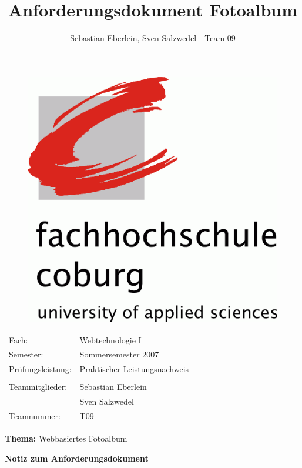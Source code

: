 \documentclass[a4paper,12pt,liststotocnumbered]{scrartcl}
\title{Anforderungsdokument Fotoalbum}
\author{Sebastian Eberlein, Sven Salzwedel - Team 09}
\begin{document}
\begin{figure}[h]
	\begin{center}
		\includegraphics[width=\textwidth/2]{logo}
	\end{center}
\end{figure}

\begin{tabularx}{\textwidth}{lX}
	Fach:&Webtechnologie I\\
	Semester:&Sommersemester 2007\\
	Prüfungsleistung:&Praktischer Leistungsnachweis\\
	&\\
	Teammitglieder:&Sebastian Eberlein\\
	&Sven Salzwedel\\
	Teamnummer:&T09\\
\end{tabularx}

\begin{center}
\end{center}

\begin{center}
	\Large{\textbf{Thema:} Webbasiertes Fotoalbum}\\
\end{center}
\begin{center}
	\Large{\textbf{Notiz zum Anforderungsdokument}}\\
\end{center}
\end{document}
